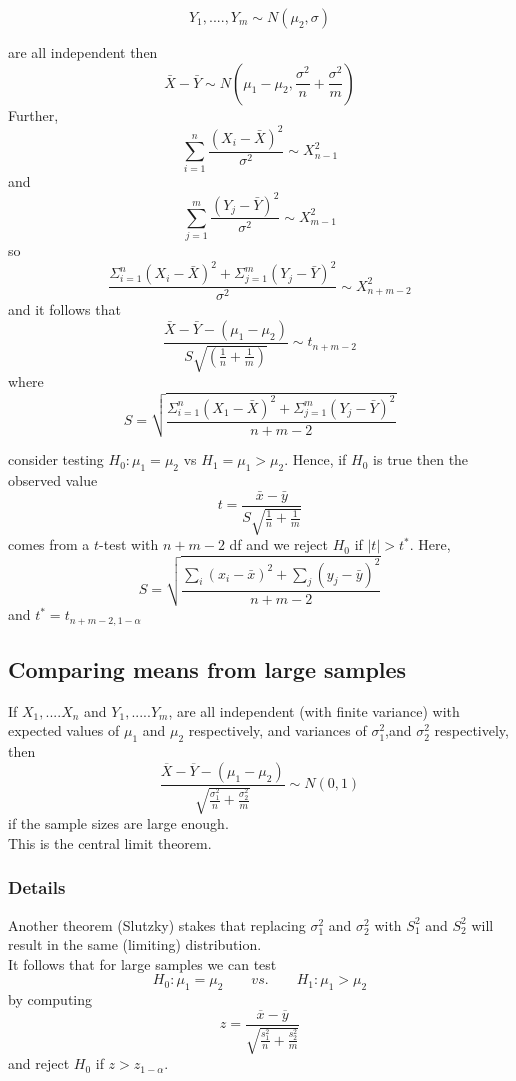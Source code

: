 \documentclass[12pt,a4paper]{article}
\theoremstyle{regla}
\theoremstyle{remark}
\theoremstyle{definition}
\theoremstyle{nonumberbreak}
\begin{document}
$$Y_1, ...., Y_m \sim N(\mu_2,\sigma)$$

 
are all independent then
$$\bar{X}-\bar{Y} \sim N(\mu_1-\mu_2,\frac{\sigma^2}{n}+\frac{\sigma^2}{m})$$
Further,
$$\sum_{i=1}^{n} \frac{(X_i-\bar{X})^2}{\sigma^2} \sim X_{n-1}^{2}$$
and
$$\sum_{j=1}^{m} \frac{(Y_j-\bar{Y})^2}{\sigma^2} \sim X_{m-1}^{2}$$
so
$$\frac {\Sigma_{i=1}^{n}(X_i-\bar{X})^2 + \Sigma_{j=1}^{m}(Y_j-\bar{Y})^2}{\sigma^2} \sim X_{n+m-2}^2$$
and it follows that
$$\frac {\bar{X}-\bar{Y}-(\mu_1-\mu_2)}{S\sqrt{(\frac{1}{n}+\frac{1}{m})}} \sim t_{n+m-2}$$
where
$$S=\sqrt{\frac{\Sigma_{i=1}^{n}(X_1-\bar{X})^2+\Sigma_{j=1}^{m}(Y_j-\bar{Y})^2}{n+m-2}}$$

consider testing $H_0:\mu_1=\mu_2$ vs $H_1=\mu_1>\mu_2$. Hence, if $H_0$ is true then the observed value
$$t=\frac{\bar{x}-\bar{y}}{S\sqrt{\frac{1}{n}+\frac{1}{m}}}$$
comes from a $t$-test with $n+m-2$ df and we reject $H_0$ if $\left|t\right|>t^\ast$. Here,
$$S=\sqrt{\frac{\sum_{i}(x_i-\bar{x})^2+\sum_{j}(y_j-\bar{y})^2}{n+m-2}}$$
and $t^\ast=t_{n+m-2,1-\alpha}$


\subsection{Comparing means from large samples}
\begin{fbox}
\begin{minipage}{0.97\textwidth}
If $X_1,....X_n$ and $Y_1,.....Y_m$, are all independent (with finite variance) with expected values of $\mu_1$ and $\mu_2$ respectively, and variances of $\sigma_1^2$,and $\sigma_2^2$ respectively, then 
$$\frac{\overline{X}-\overline{Y}-(\mu_1-\mu_2)}{\sqrt{\frac{\sigma_1^2}{n}+\frac{\sigma_2^2}{m}}} \sim N(0,1)$$
if the sample sizes are large enough.\\

This is the central limit theorem.
\end{minipage}
\end{fbox}
\subsubsection{Details}
Another theorem (Slutzky) stakes that replacing $\sigma_1^2$ and $\sigma_2^2$ with $S_1^2$ and $S_2^2$ will result in the same (limiting) distribution.\\

It follows that for large samples we can test
$$H_0: \mu_1=\mu_2 \qquad vs. \qquad H_1:\mu_1 > \mu_2$$
by computing $$z=\frac{\overline{x}-\overline{y}}{\sqrt{\frac{s_1^2}{n}+\frac{s_2^2}{m}}}$$
and reject $H_0$ if $z>z_{1-\alpha}$.
\end{document}

